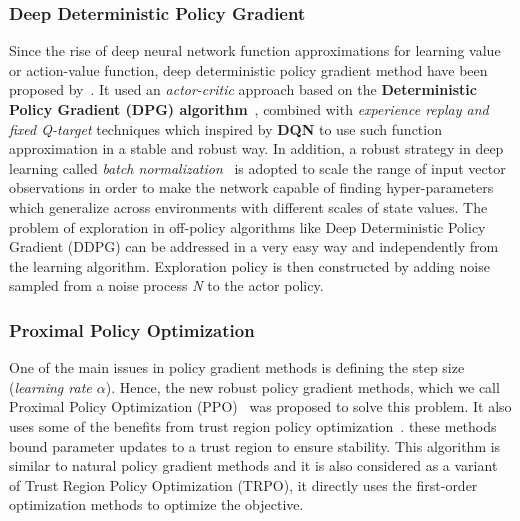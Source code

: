 \subsubsection{Deep Deterministic Policy Gradient}
Since the rise of deep neural network function approximations for learning value or action-value function, deep deterministic policy gradient method have been proposed by~\parencite{lillicrap2015continuous}. It used an \textit{actor-critic} approach based on the \textbf{Deterministic Policy Gradient (DPG) algorithm}~\parencite{silver2014deterministic}, combined with \textit{experience replay and fixed Q-target} techniques which inspired by \textbf{DQN} to use such function approximation in a stable and robust way. In addition, a robust strategy in deep learning called \textit{batch normalization}~\parencite{ioffe2015batch} is adopted to scale the range of input vector observations in order to make the network capable of finding hyper-parameters which generalize across environments with different scales of state values.
The problem of exploration in off-policy algorithms like Deep Deterministic Policy Gradient (DDPG) can be addressed in a very easy way and independently from the learning algorithm. Exploration policy is then constructed by adding noise sampled from a noise process \textit{N} to the actor policy.

\subsubsection{Proximal Policy Optimization}
One of the main issues in policy gradient methods is defining the step size (\textit{learning rate $\alpha$}). Hence, the new robust policy gradient methods, which we call Proximal Policy Optimization (PPO)~\parencite{schulman2017proximal, heess2017emergence} was proposed to solve this problem. It also uses some of the benefits from trust region policy optimization~\parencite{schulman2015trust}. these methods bound parameter updates to a trust region to ensure stability. This algorithm is similar to natural policy gradient methods and it is also considered as a variant of Trust Region Policy Optimization (TRPO), it directly uses the first-order optimization methods to optimize the objective.

